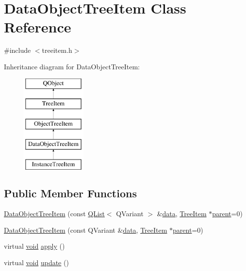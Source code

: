 \hypertarget{class_data_object_tree_item}{\section{Data\-Object\-Tree\-Item Class Reference}
\label{class_data_object_tree_item}
}


{\ttfamily \#include $<$treeitem.\-h$>$}

Inheritance diagram for Data\-Object\-Tree\-Item\-:\begin{figure}[H]
\begin{center}
\leavevmode
\includegraphics[height=5.000000cm]{class_data_object_tree_item}
\end{center}
\end{figure}
\subsection*{Public Member Functions}
\begin{DoxyCompactItemize}
\item 
\hyperlink{group___u_a_v_object_browser_plugin_gabc056eda5e72e5f0bebe3fd41fd5f552}{Data\-Object\-Tree\-Item} (const \hyperlink{class_q_list}{Q\-List}$<$ Q\-Variant $>$ \&\hyperlink{glext_8h_a8850df0785e6fbcc2351af3b686b8c7a}{data}, \hyperlink{class_tree_item}{Tree\-Item} $\ast$\hyperlink{group___u_a_v_object_browser_plugin_gaa3a7ba624312b6be70872634db291881}{parent}=0)
\item 
\hyperlink{group___u_a_v_object_browser_plugin_ga1a938e6bed78334aef5b0a9c4050e847}{Data\-Object\-Tree\-Item} (const Q\-Variant \&\hyperlink{glext_8h_a8850df0785e6fbcc2351af3b686b8c7a}{data}, \hyperlink{class_tree_item}{Tree\-Item} $\ast$\hyperlink{group___u_a_v_object_browser_plugin_gaa3a7ba624312b6be70872634db291881}{parent}=0)
\item 
virtual \hyperlink{group___u_a_v_objects_plugin_ga444cf2ff3f0ecbe028adce838d373f5c}{void} \hyperlink{group___u_a_v_object_browser_plugin_gab322316ea60cf5981a289051b8d486b3}{apply} ()
\item 
virtual \hyperlink{group___u_a_v_objects_plugin_ga444cf2ff3f0ecbe028adce838d373f5c}{void} \hyperlink{group___u_a_v_object_browser_plugin_ga758265673ec0372a0dbb0ccd04d957d2}{update} ()
\end{DoxyCompactItemize}
